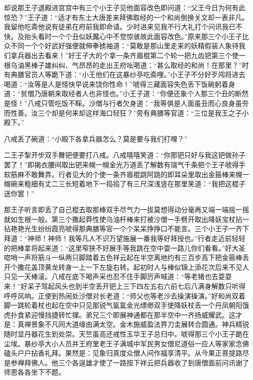 \documentclass[12pt,UTF8]{ctexbook}
\begin{document}
{	却说那王子退殿进宫宫中有三个小王子见他面容改色即问道：“父王今日为何有此惊恐？”王子道：“适才有东土大唐差来拜佛取经的一个和尚倒换关文却一表非凡。我留他吃斋他说有徒弟在府前我即命请。少时进来见我不行大礼打个问讯我已不快。及抬头看时一个个丑似妖魔心中不觉惊骇故此面容改色。”原来那三个小王子比众不同一个个好武好强便就伸拳掳袖道：“莫敢是那山里走来的妖精假装人象待我们拿兵器出去看来！”好王子大的个拿一条齐眉棍第二个轮一把九齿钯第三个使一根乌油黑棒子雄纠纠、气昂昂的走出王府吆喝道：“甚么取经的和尚！在那里？”时有典膳官员人等跪下道：“小王他们在这暴纱亭吃斋哩。”小王子不分好歹闯将进去喝道：“汝等是人是怪快早说来饶你性命！”唬得三藏面容失色丢下饭碗躬着身道：“贫僧乃唐朝来取经者人也非怪也。”小王子道：“你便还象个人那三个丑的断然是怪！”八戒只管吃饭不睬。沙僧与行者欠身道：“我等俱是人面虽丑而心良身虽夯而性善。汝三个却是何来却这样海口轻狂？”旁有典膳等官道：“三位是我王之子小殿下。”
	
	八戒丢了碗道：“小殿下各拿兵器怎么？莫是要与我们打哩？”
	
	二王子掣开步双手舞钯便要打八戒。八戒嘻嘻笑道：“你那钯只好与我这钯做孙子罢了！”即揭衣腰间取出钯来幌一幌金光万道丢了解数有瑞气千条把个王子唬得手软筋麻不敢舞弄。行者见大的个使一条齐眉棍跳阿跳的即耳朵里取出金箍棒来幌一幌碗来粗细有丈二三长短着地下一捣捣了有三尺深浅竖在那里笑道：“我把这棍子送你罢！”
	
	那王子听言即丢了自己棍去取那棒双手尽气力一拔莫想得动分毫再又端一端摇一摇就如生根一般。第三个撒起莽性使乌油杆棒来打被沙僧一手劈开取出降妖宝杖拈一拈艳艳光生纷纷霞亮唬得那典膳等官一个个呆呆挣挣口不能言。三个小王子一齐下拜道：“神师！神师！我等凡人不识万望施展一番我等好拜授也。”行者走近前轻轻的把棒拿将起来道：“这里窄狭不好展手等我跳在空中耍一路儿你们看看。”好大圣唿哨一声将筋斗一纵两只脚踏着五色祥云起在半空离地约有三百步高下把金箍棒丢开个撒花盖顶黄龙转身一上一下左旋右转。起初时人与棒似锦上添花次后来不见人只见一天棒滚。八戒在底下喝声采也忍不住手脚厉声喊道：“等老猪也去耍耍来！”好呆子驾起风头也到半空丢开钯上三下四左五右六前七后八满身解数只听得呼呼风响。正使到热闹处沙僧对长老道：“师父也等老沙去操演操演。”好和尚双着脚一跳轮着杖也起在空中只见那锐气氤氲金光缥缈双手使降妖杖丢一个丹凤朝阳饿虎扑食紧迎慢挡捷转忙撺。弟兄三个即展神通都在那半空中一齐扬威耀武。这才是：真禅景象不凡同大道缘由满太空。金木施威盈法界刀圭展转合圆通。神兵精锐随时显丹器花生到处崇。天竺虽高还戒性玉华王子总归中。唬得那三个小王子跪在尘埃。暴纱亭大小人员并王府里老王子满城中军民男女僧尼道俗一应人等家家念佛磕头户户拈香礼拜。果然是：见象归真度众僧人间作福享清平。从今果正菩提路尽是参禅拜佛人。他三个各逞雄才使了一路按下祥云把兵器收了到唐僧面前问讯谢了师恩各各坐下不题。
	
}
\end{document}
